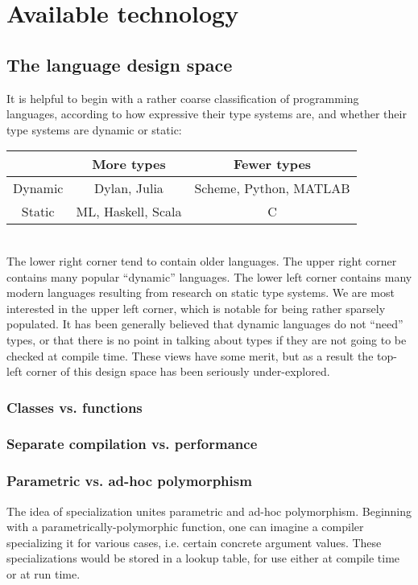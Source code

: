 \chapter{Available technology}


\section{The language design space}

It is helpful to begin with a rather coarse classification of programming
languages, according to how expressive their type systems are, and whether
their type systems are dynamic or static:
\\
\begin{tabular}{|c||c|c|}
\hline 
 & More types & Fewer types\tabularnewline
\hline 
\hline 
Dynamic & Dylan, Julia & Scheme, Python, MATLAB\tabularnewline
\hline 
Static & ML, Haskell, Scala & C\tabularnewline
\hline 
\end{tabular}
\\

The lower right corner tend to contain older languages. The upper right corner
contains many popular ``dynamic'' languages. The lower left corner contains
many modern languages resulting from research on static type systems.
We are most interested in the upper left corner, which is notable for being
rather sparsely populated. It has been generally believed that dynamic
languages do not ``need'' types, or that there is no point in talking about
types if they are not going to be checked at compile time. These views have
some merit, but as a result the top-left corner of this design space has
been seriously under-explored.

\subsection{Classes vs. functions}

\subsection{Separate compilation vs. performance}

\subsection{Parametric vs. ad-hoc polymorphism}

The idea of specialization unites parametric and ad-hoc polymorphism.
Beginning with a parametrically-polymorphic function, one can imagine
a compiler specializing it for various cases, i.e. certain concrete argument
values. These specializations would be stored in a lookup table, for use
either at compile time or at run time.


